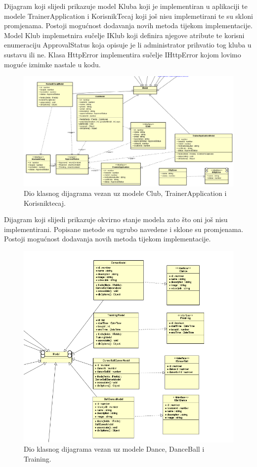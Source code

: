 			\noindent Dijagram koji slijedi prikazuje model Kluba koji je implementiran u aplikaciji te modele TrainerApplication i KorisnikTecaj
			koji još nisu implemetirani te su skloni promjenama. Postoji mogućnost dodavanja novih metoda tijekom implementacije.
			Model Klub implemetnira sučelje IKlub koji definira njegove atribute te korisni enumeraciju ApprovalStatus koja opisuje je li 
			administrator prihvatio tog kluba u sustavu ili ne. Klasa HttpError implementira sučelje IHttpError kojom lovimo moguće iznimke 
			nastale u kodu.\\
			\begin{figure}[H]
				\includegraphics[scale=0.7]{slike/class2.png}
				\centering
				\caption{Dio klasnog dijagrama vezan uz modele Club, TrainerApplication i Korisniktecaj.}
				\label{fig:class1}
			\end{figure}

			\noindent Dijagram koji slijedi prikazuje okvirno stanje modela zato što oni još nisu implementirani. Popisane metode su 
			ugrubo navedene i sklone su promjenama. Postoji mogućnost dodavanja novih metoda tijekom implementacije.\\
			\begin{figure}[H]
				\includegraphics[scale=1.0]{slike/class3.png}
				\centering
				\caption{Dio klasnog dijagrama vezan uz modele Dance, DanceBall i Training.}
				\label{fig:class1}
			\end{figure}

